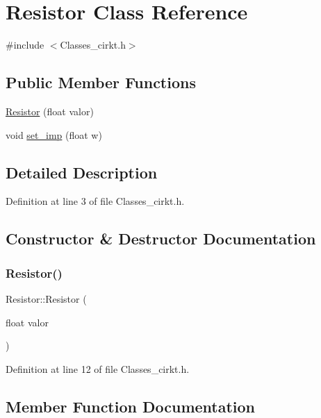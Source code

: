 \hypertarget{class_resistor}{}\section{Resistor Class Reference}
\label{class_resistor}


{\ttfamily \#include $<$Classes\+\_\+cirkt.\+h$>$}

\subsection*{Public Member Functions}
\begin{DoxyCompactItemize}
\item 
\mbox{\hyperlink{class_resistor_af51e11292a6823f790faf0e9a54261a8}{Resistor}} (float valor)
\item 
void \mbox{\hyperlink{class_resistor_a987c8105d01bbf5e8183c8a7be42c0b1}{set\+\_\+imp}} (float w)
\end{DoxyCompactItemize}


\subsection{Detailed Description}


Definition at line 3 of file Classes\+\_\+cirkt.\+h.



\subsection{Constructor \& Destructor Documentation}
\mbox{\label{class_resistor_af51e11292a6823f790faf0e9a54261a8}} 
\subsubsection{\texorpdfstring{Resistor()}{Resistor()}}
{\footnotesize\ttfamily Resistor\+::\+Resistor (\begin{DoxyParamCaption}\item[{float}]{valor }\end{DoxyParamCaption})}



Definition at line 12 of file Classes\+\_\+cirkt.\+h.



\subsection{Member Function Documentation}
\mbox{\label{class_resistor_a987c8105d01bbf5e8183c8a7be42c0b1}} 
